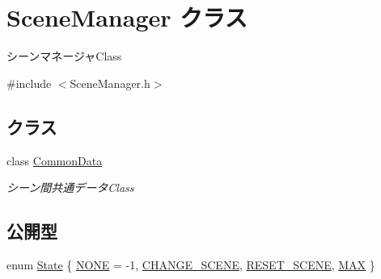 \hypertarget{class_scene_manager}{}\section{Scene\+Manager クラス}
\label{class_scene_manager}


シーンマネージャ\+Class  




{\ttfamily \#include $<$Scene\+Manager.\+h$>$}

\subsection*{クラス}
\begin{DoxyCompactItemize}
\item 
class \mbox{\hyperlink{class_scene_manager_1_1_common_data}{Common\+Data}}
\begin{DoxyCompactList}\small\item\em シーン間共通データ\+Class \end{DoxyCompactList}\end{DoxyCompactItemize}
\subsection*{公開型}
\begin{DoxyCompactItemize}
\item 
enum \mbox{\hyperlink{class_scene_manager_a68d32794fe1ce945c6a6c380c11a08eb}{State}} \{ \mbox{\hyperlink{class_scene_manager_a68d32794fe1ce945c6a6c380c11a08eba8cd4a237fa57487ca812c21216c5d77c}{N\+O\+NE}} = -\/1, 
\mbox{\hyperlink{class_scene_manager_a68d32794fe1ce945c6a6c380c11a08eba221613d2f5fb26ba3c9af4597df566fe}{C\+H\+A\+N\+G\+E\+\_\+\+S\+C\+E\+NE}}, 
\mbox{\hyperlink{class_scene_manager_a68d32794fe1ce945c6a6c380c11a08eba9e2198b05b1320b8aabfc855b8e81e82}{R\+E\+S\+E\+T\+\_\+\+S\+C\+E\+NE}}, 
\mbox{\hyperlink{class_scene_manager_a68d32794fe1ce945c6a6c380c11a08eba67b231706633f4d8aaadf6830078dd68}{M\+AX}}
 \}
\end{DoxyCompactItemize}
